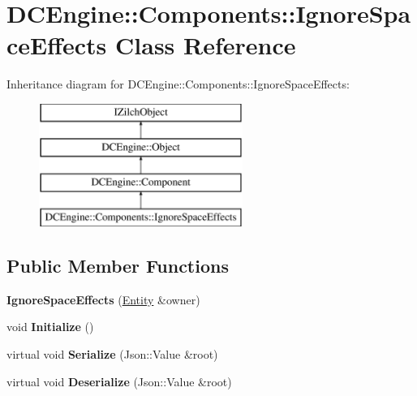 \hypertarget{classDCEngine_1_1Components_1_1IgnoreSpaceEffects}{\section{D\-C\-Engine\-:\-:Components\-:\-:Ignore\-Space\-Effects Class Reference}
\label{classDCEngine_1_1Components_1_1IgnoreSpaceEffects}
}
Inheritance diagram for D\-C\-Engine\-:\-:Components\-:\-:Ignore\-Space\-Effects\-:\begin{figure}[H]
\begin{center}
\leavevmode
\includegraphics[height=4.000000cm]{classDCEngine_1_1Components_1_1IgnoreSpaceEffects}
\end{center}
\end{figure}
\subsection*{Public Member Functions}
\begin{DoxyCompactItemize}
\item 
\hypertarget{classDCEngine_1_1Components_1_1IgnoreSpaceEffects_a456e96195a3f8fef2c1f9db8dc7d448b}{{\bfseries Ignore\-Space\-Effects} (\hyperlink{classDCEngine_1_1Entity}{Entity} \&owner)}\label{classDCEngine_1_1Components_1_1IgnoreSpaceEffects_a456e96195a3f8fef2c1f9db8dc7d448b}

\item 
\hypertarget{classDCEngine_1_1Components_1_1IgnoreSpaceEffects_a4b3ab557fbfc5a6f12a9b2825951b361}{void {\bfseries Initialize} ()}\label{classDCEngine_1_1Components_1_1IgnoreSpaceEffects_a4b3ab557fbfc5a6f12a9b2825951b361}

\item 
\hypertarget{classDCEngine_1_1Components_1_1IgnoreSpaceEffects_ab9ceb7c89c0671a89922c7a3ae6628bc}{virtual void {\bfseries Serialize} (Json\-::\-Value \&root)}\label{classDCEngine_1_1Components_1_1IgnoreSpaceEffects_ab9ceb7c89c0671a89922c7a3ae6628bc}

\item 
\hypertarget{classDCEngine_1_1Components_1_1IgnoreSpaceEffects_a68507d413b4b600072320701baa9cf1c}{virtual void {\bfseries Deserialize} (Json\-::\-Value \&root)}\label{classDCEngine_1_1Components_1_1IgnoreSpaceEffects_a68507d413b4b600072320701baa9cf1c}

\end{DoxyCompactItemize}
